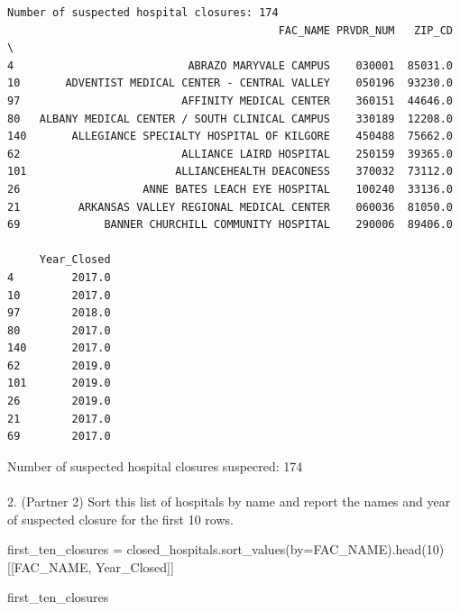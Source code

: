\documentclass[
  letterpaper,
  DIV=11,
  numbers=noendperiod]{scrartcl}
\makeatletter
\let\oldparagraph\paragraph
\renewcommand{\paragraph}{
    \@ifstar
      \xxxParagraphStar
      \xxxParagraphNoStar
  }
\newcommand{\xxxParagraphStar}[1]{\oldparagraph*{#1}\mbox{}}
\newcommand{\xxxParagraphNoStar}[1]{\oldparagraph{#1}\mbox{}}
\newenvironment{Shaded}{\begin{snugshade}}{\end{snugshade}}
\newcommand{\DecValTok}[1]{\textcolor[rgb]{0.68,0.00,0.00}{#1}}
\newcommand{\NormalTok}[1]{\textcolor[rgb]{0.00,0.23,0.31}{#1}}
\newcommand{\OperatorTok}[1]{\textcolor[rgb]{0.37,0.37,0.37}{#1}}
\newcommand{\StringTok}[1]{\textcolor[rgb]{0.13,0.47,0.30}{#1}}
\makeatother
\begin{document}
\begin{verbatim}
Number of suspected hospital closures: 174
                                          FAC_NAME PRVDR_NUM   ZIP_CD  \
4                           ABRAZO MARYVALE CAMPUS    030001  85031.0   
10       ADVENTIST MEDICAL CENTER - CENTRAL VALLEY    050196  93230.0   
97                         AFFINITY MEDICAL CENTER    360151  44646.0   
80   ALBANY MEDICAL CENTER / SOUTH CLINICAL CAMPUS    330189  12208.0   
140       ALLEGIANCE SPECIALTY HOSPITAL OF KILGORE    450488  75662.0   
62                         ALLIANCE LAIRD HOSPITAL    250159  39365.0   
101                       ALLIANCEHEALTH DEACONESS    370032  73112.0   
26                   ANNE BATES LEACH EYE HOSPITAL    100240  33136.0   
21         ARKANSAS VALLEY REGIONAL MEDICAL CENTER    060036  81050.0   
69             BANNER CHURCHILL COMMUNITY HOSPITAL    290006  89406.0   

     Year_Closed  
4         2017.0  
10        2017.0  
97        2018.0  
80        2017.0  
140       2017.0  
62        2019.0  
101       2019.0  
26        2019.0  
21        2017.0  
69        2017.0  
\end{verbatim}

Number of suspected hospital closures suspecred: 174

\paragraph{2. (Partner 2) Sort this list of hospitals by name and report
the names and year of suspected closure for the first 10
rows.}\label{partner-2-sort-this-list-of-hospitals-by-name-and-report-the-names-and-year-of-suspected-closure-for-the-first-10-rows.}

\begin{Shaded}
\begin{Highlighting}[]
\NormalTok{first\_ten\_closures }\OperatorTok{=}\NormalTok{ closed\_hospitals.sort\_values(by}\OperatorTok{=}\StringTok{\textquotesingle{}FAC\_NAME\textquotesingle{}}\NormalTok{).head(}\DecValTok{10}\NormalTok{)[[}\StringTok{\textquotesingle{}FAC\_NAME\textquotesingle{}}\NormalTok{, }\StringTok{\textquotesingle{}Year\_Closed\textquotesingle{}}\NormalTok{]]}

\NormalTok{first\_ten\_closures}
\end{Highlighting}
\end{Shaded}
\end{document}
